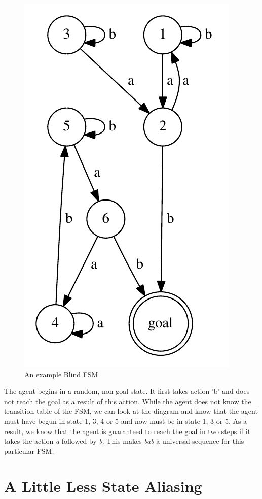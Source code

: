 \documentclass[letterpaper]{article} %
\begin{document}
\begin{figure}[t]
\centering
\includegraphics[width=0.6\columnwidth]{ExampleFSM} %
\caption{An example Blind FSM}
\label{fig1}
\end{figure}



The agent begins in a random, non-goal state.  It first takes action
'b' and does not reach the goal as a result of this action.  While the
agent does not know the transition table of the FSM, we can look at
the diagram and know that the agent must have begun in state 1, 3, 4
or 5 and now must be in state 1, 3 or 5.  As a result, we know that
the agent is guaranteed to reach the goal in two steps if it takes the
action \textit{a} followed by \textit{b}.  This makes \textit{bab} a
universal sequence for this particular FSM.

\section{A Little Less State Aliasing}
\end{document}
